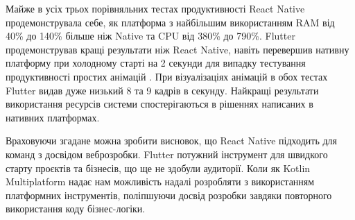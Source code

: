 Майже в усіх трьох порівняльних тестах продуктивності React Native продемонструвала себе, як платформа з найбільшим
використанням RAM від 40\% до 140\% більше ніж Native та CPU від 380\% до 790\%. Flutter продемонстрував кращі результати
ніж React Native, навіть перевершив нативну платформу при холодному старті на 2 секунди для випадку тестування
продуктивності простих анімацій \cite{inVerita}.
При візуалізаціях анімацій в обох тестах Flutter видав дуже низький 8 та 9 кадрів в секунду.
Найкращі результати використання ресурсів системи спостерігаються в рішеннях написаних в нативних платформах.

Враховуючи згадане можна зробити висновок, що React Native підходить для команд з досвідом веброзробки.
Flutter потужний інструмент для швидкого старту проєктів та бізнесів, що ще не здобули аудиторії.
Коли як Kotlin Multiplatform надає нам можливість надалі розробляти з використанням платформних інструментів,
поліпшуючи досвід розробки завдяки повторного використання коду бізнес-логіки.

